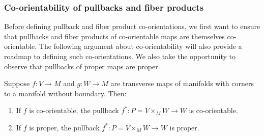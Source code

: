 \subsubsection{Co-orientability of pullbacks and fiber products}

Before defining pullback and fiber product co-orientations, we first want to ensure that pullbacks and fiber products of co-orientable maps are themselves co-orientable.
The following argument about co-orientability will also provide a roadmap to defining such co-orientations.
We also take the opportunity to observe that pullbacks of proper maps are proper.

\begin{lemma}\label{L: co-orientable pullback}
	Suppose $f \colon V \to M$ and $g \colon W \to M$ are transverse maps of manifolds with corners to a manifold without boundary.
	Then:
	\begin{enumerate}
		\item{} If $f$ is co-orientable, the pullback $f^* \colon P = V \times_M W \to W$ is co-orientable.
		\item{} If $f$ is proper, the pullback $f^* \colon P = V \times_M W \to W$ is proper.
	\end{enumerate}
\end{lemma}

